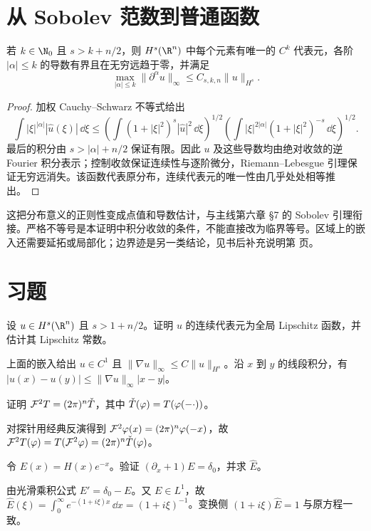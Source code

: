 \section{从 Sobolev 范数到普通函数}\label{sec:topic-sobolev-embedding}
\begin{proposition}[全空间的连续嵌入]\label{prop:topic-sobolev-embedding}
若 $k\in\N_0$ 且 $s>k+n/2$，则 $H^s(\R^n)$ 中每个元素有唯一的 $C^k$ 代表元，各阶 $|\alpha|\le k$ 的导数有界且在无穷远趋于零，并满足
\[
 \max_{|\alpha|\le k}\|\partial^\alpha u\|_\infty
 \le C_{s,k,n}\|u\|_{H^s}.
\]
\end{proposition}
\begin{proof}
加权 Cauchy--Schwarz 不等式给出
\[
 \int |\xi|^{|\alpha|}|\widehat u(\xi)|\,\dd\xi
 \le \left(\int(1+|\xi|^2)^s|\widehat u|^2\,\dd\xi\right)^{1/2}
 \left(\int |\xi|^{2|\alpha|}(1+|\xi|^2)^{-s}\,\dd\xi\right)^{1/2}.
\]
最后的积分由 $s>|\alpha|+n/2$ 保证有限。因此 $u$ 及这些导数均由绝对收敛的逆 Fourier 积分表示；控制收敛保证连续性与逐阶微分，Riemann--Lebesgue 引理保证无穷远消失。该函数代表原分布，连续代表元的唯一性由几乎处处相等推出。
\end{proof}
这把分布意义的正则性变成点值和导数估计，与主线第六章 §7 的 Sobolev 引理衔接。严格不等号是本证明中积分收敛的条件，不能直接改为临界等号。区域上的嵌入还需要延拓或局部化；边界迹是另一类结论，见书后补充说明第 \pageref{sec:supp-trace} 页。

\section{习题}
\begin{exercise}[高阶导数的有界性]
设 $u\in H^s(\R^n)$ 且 $s>1+n/2$。证明 $u$ 的连续代表元为全局 Lipschitz 函数，并估计其 Lipschitz 常数。
\end{exercise}
\begin{solution}
上面的嵌入给出 $u\in C^1$ 且 $\|\nabla u\|_\infty\le C\|u\|_{H^s}$。沿 $x$ 到 $y$ 的线段积分，有 $|u(x)-u(y)|\le\|\nabla u\|_\infty|x-y|$。
\end{solution}
\begin{exercise}[二次变换]
证明 $\mathcal{F}^2T=(2\pi)^n\check{T}$，其中 $\check{T}(\varphi)=T(\varphi(-\cdot))$。
\end{exercise}
\begin{solution}
对探针用经典反演得到 $\mathcal{F}^2\varphi(x)=(2\pi)^n\varphi(-x)$，故 $\mathcal{F}^2T(\varphi)=T(\mathcal{F}^2\varphi)=(2\pi)^n\check{T}(\varphi)$。
\end{solution}
\begin{exercise}[一阶基本解的变换]
令 $E(x)=H(x)e^{-x}$。验证 $(\partial_x+1)E=\delta_0$，并求 $\widehat E$。
\end{exercise}
\begin{solution}
由光滑乘积公式 $E'=\delta_0-E$。又 $E\in L^1$，故 $\widehat E(\xi)=\int_0^\infty e^{-(1+i\xi)x}\,\dd x=(1+i\xi)^{-1}$。变换侧 $(1+i\xi)\widehat E=1$ 与原方程一致。
\end{solution}
